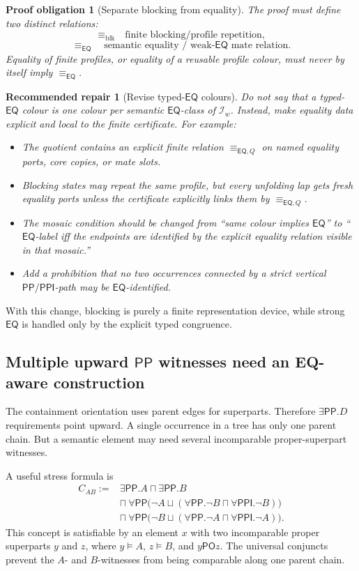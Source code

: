 \documentclass[11pt]{article}
\newcommand{\PP}{\mathsf{PP}}
\newcommand{\PPI}{\mathsf{PPI}}
\newcommand{\PO}{\mathsf{PO}}
\newcommand{\EQ}{\mathsf{EQ}}
\newcommand{\eqcong}{\equiv_{\EQ}}
\newcommand{\blk}{\equiv_{\mathrm{blk}}}
\newtheorem{obligation}{Proof obligation}
\newtheorem{recommendation}{Recommended repair}
\begin{document}
\begin{obligation}[Separate blocking from equality]
The proof must define two distinct relations:
\[
  \blk \quad\text{finite blocking/profile repetition,}
\]
\[
  \eqcong \quad\text{semantic equality / weak-}\EQ\text{ mate relation.}
\]
Equality of finite profiles, or equality of a reusable profile colour, must
never by itself imply \(\eqcong\).
\end{obligation}

\begin{recommendation}[Revise typed-\(\EQ\) colours]
Do not say that a typed-\(\EQ\) colour is one colour per semantic \(\EQ\)-class
of \(\mathcal I_w\).  Instead, make equality data explicit and local to the
finite certificate.  For example:
\begin{itemize}[leftmargin=2em]
\item The quotient contains an explicit finite relation \(\equiv_{\EQ,Q}\) on
  named equality ports, core copies, or mate slots.
\item Blocking states may repeat the same profile, but every unfolding lap gets
  fresh equality ports unless the certificate explicitly links them by
  \(\equiv_{\EQ,Q}\).
\item The mosaic condition should be changed from ``same colour implies
  \(\EQ\)'' to ``\(\EQ\)-label iff the endpoints are identified by the explicit
  equality relation visible in that mosaic.''
\item Add a prohibition that no two occurrences connected by a strict vertical
  \(\PP/\PPI\)-path may be \(\EQ\)-identified.
\end{itemize}
\end{recommendation}

With this change, blocking is purely a finite representation device, while
strong \(\EQ\) is handled only by the explicit typed congruence.

\subsection{Multiple upward \texorpdfstring{$\PP$}{PP} witnesses need an EQ-aware construction}

The containment orientation uses parent edges for superparts.  Therefore
\(\exists\PP.D\) requirements point upward.  A single occurrence in a tree has
only one parent chain.  But a semantic element may need several incomparable
proper-superpart witnesses.

A useful stress formula is
\[
\begin{aligned}
C_{AB} := {}& \exists\PP.A \sqcap \exists\PP.B \\
&\sqcap\ \forall\PP\bigl(\neg A \sqcup
   (\forall\PP.\neg B \sqcap \forall\PPI.\neg B)\bigr) \\
&\sqcap\ \forall\PP\bigl(\neg B \sqcup
   (\forall\PP.\neg A \sqcap \forall\PPI.\neg A)\bigr).
\end{aligned}
\]
This concept is satisfiable by an element \(x\) with two incomparable proper
superparts \(y\) and \(z\), where \(y\models A\), \(z\models B\), and
\(y\PO z\).  The universal conjuncts prevent the \(A\)- and \(B\)-witnesses from
being comparable along one parent chain.
\end{document}
